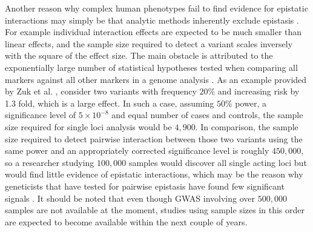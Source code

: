 Another reason why complex human phenotypes fail to find evidence for epistatic interactions may simply be that analytic methods inherently exclude epistasis \cite{culverhouse2002perspective}.
For example individual interaction effects are expected to be much smaller than linear effects, and the sample size required to detect a variant scales inversely with the square of the effect size. 
The main obstacle is attributed to the exponentially large number of statistical hypotheses tested when comparing all markers against all other markers in a genome analysis \cite{ackermann2012systematic}.
As an example provided by Zuk et al. \cite{zuk2012mystery}, consider two variants with frequency $20\%$ and increasing risk by 1.3 fold, which is a large effect.
In such a case, assuming $50\%$ power, a significance level of $5 \times 10^{-8}$  and equal number of cases and controls, the sample size required for single loci analysis would be $4,900$.
In comparison, the sample size required to detect pairwise interaction between those two variants using the same power and an appropriately corrected significance level is roughly $450,000$, so a researcher studying $100,000$ samples would discover all single acting loci but would find little evidence of epistatic interactions, which may be the reason why geneticists that have tested for pairwise epistasis have found few significant signals \cite{zuk2012mystery}.
It should be noted that even though GWAS involving over $500,000$ samples are not available at the moment, studies using sample sizes in this order are expected to become available within the next couple of years.

